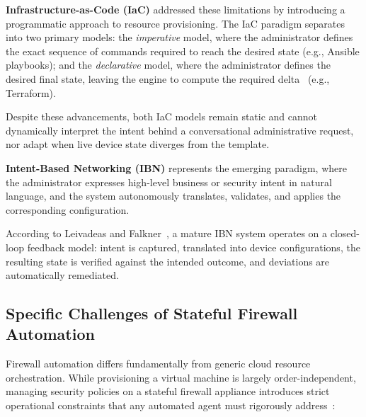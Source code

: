 \textbf{Infrastructure-as-Code (IaC)} addressed these limitations by introducing a programmatic approach to resource provisioning. The IaC paradigm separates into two primary models: the \emph{imperative} model, where the administrator defines the exact sequence of commands required to reach the desired state (e.g., Ansible playbooks); and the \emph{declarative} model, where the administrator defines the desired final state, leaving the engine to compute the required delta~\cite{hashicorp_terraform} (e.g., Terraform). 

Despite these advancements, both IaC models remain static and cannot dynamically interpret the intent behind a conversational administrative request, nor adapt when live device state diverges from the template.

\textbf{Intent-Based Networking (IBN)} represents the emerging paradigm, where the administrator expresses high-level business or security intent in natural language, and the system autonomously translates, validates, and applies the corresponding configuration. 

According to Leivadeas and Falkner~\cite{leivadeas2022survey}, a mature IBN system operates on a closed-loop feedback model: intent is captured, translated into device configurations, the resulting state is verified against the intended outcome, and deviations are automatically remediated.

\subsection{Specific Challenges of Stateful Firewall Automation}
Firewall automation differs fundamentally from generic cloud resource orchestration. While provisioning a virtual machine is largely order-independent, managing security policies on a stateful firewall appliance introduces strict operational constraints that any automated agent must rigorously address~\cite{alshaer2004discovery}:

